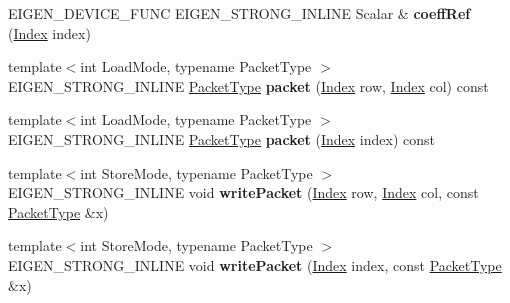 \begin{DoxyCompactItemize}
\mbox{\label{struct_eigen_1_1internal_1_1evaluator_3_01_plain_object_base_3_01_derived_01_4_01_4_a1704a0c9fee5e1632a3472f7b321d157}} 
E\+I\+G\+E\+N\+\_\+\+D\+E\+V\+I\+C\+E\+\_\+\+F\+U\+NC E\+I\+G\+E\+N\+\_\+\+S\+T\+R\+O\+N\+G\+\_\+\+I\+N\+L\+I\+NE Scalar \& {\bfseries coeff\+Ref} (\hyperlink{namespace_eigen_a62e77e0933482dafde8fe197d9a2cfde}{Index} index)
\item 
\mbox{\label{struct_eigen_1_1internal_1_1evaluator_3_01_plain_object_base_3_01_derived_01_4_01_4_a6b33a92b0489152b53b04de36e2fb686}} 
{\footnotesize template$<$int Load\+Mode, typename Packet\+Type $>$ }\\E\+I\+G\+E\+N\+\_\+\+S\+T\+R\+O\+N\+G\+\_\+\+I\+N\+L\+I\+NE \hyperlink{struct_eigen_1_1_packet_type}{Packet\+Type} {\bfseries packet} (\hyperlink{namespace_eigen_a62e77e0933482dafde8fe197d9a2cfde}{Index} row, \hyperlink{namespace_eigen_a62e77e0933482dafde8fe197d9a2cfde}{Index} col) const
\item 
\mbox{\label{struct_eigen_1_1internal_1_1evaluator_3_01_plain_object_base_3_01_derived_01_4_01_4_a9dfaff7a6235a590d508d72abf6da9dd}} 
{\footnotesize template$<$int Load\+Mode, typename Packet\+Type $>$ }\\E\+I\+G\+E\+N\+\_\+\+S\+T\+R\+O\+N\+G\+\_\+\+I\+N\+L\+I\+NE \hyperlink{struct_eigen_1_1_packet_type}{Packet\+Type} {\bfseries packet} (\hyperlink{namespace_eigen_a62e77e0933482dafde8fe197d9a2cfde}{Index} index) const
\item 
\mbox{\label{struct_eigen_1_1internal_1_1evaluator_3_01_plain_object_base_3_01_derived_01_4_01_4_a9e809337fe9d1dd065249d7a0134c5ab}} 
{\footnotesize template$<$int Store\+Mode, typename Packet\+Type $>$ }\\E\+I\+G\+E\+N\+\_\+\+S\+T\+R\+O\+N\+G\+\_\+\+I\+N\+L\+I\+NE void {\bfseries write\+Packet} (\hyperlink{namespace_eigen_a62e77e0933482dafde8fe197d9a2cfde}{Index} row, \hyperlink{namespace_eigen_a62e77e0933482dafde8fe197d9a2cfde}{Index} col, const \hyperlink{struct_eigen_1_1_packet_type}{Packet\+Type} \&x)
\item 
\mbox{\label{struct_eigen_1_1internal_1_1evaluator_3_01_plain_object_base_3_01_derived_01_4_01_4_aac4e36788f0666e4bdd7a348809263d3}} 
{\footnotesize template$<$int Store\+Mode, typename Packet\+Type $>$ }\\E\+I\+G\+E\+N\+\_\+\+S\+T\+R\+O\+N\+G\+\_\+\+I\+N\+L\+I\+NE void {\bfseries write\+Packet} (\hyperlink{namespace_eigen_a62e77e0933482dafde8fe197d9a2cfde}{Index} index, const \hyperlink{struct_eigen_1_1_packet_type}{Packet\+Type} \&x)
\end{DoxyCompactItemize}
